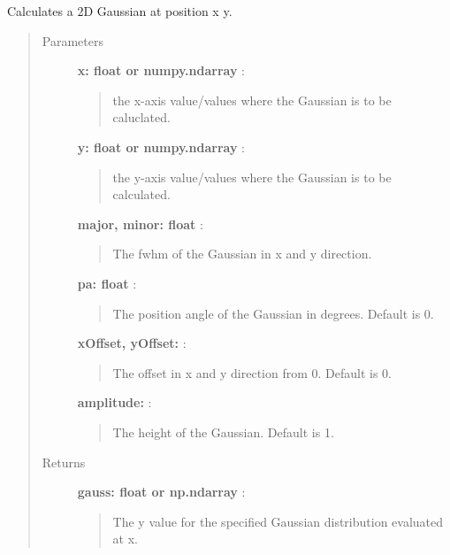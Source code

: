 \documentclass[a4paper,10pt,english]{sphinxmanual}
\begin{document}

\begin{fulllineitems}
\label{functions:astrolyze.functions.astro_functions.gauss2D}
Calculates a 2D Gaussian at position x y.
\begin{quote}\begin{description}
\item[{Parameters }] \leavevmode
\textbf{x: float or numpy.ndarray} :
\begin{quote}

the x-axis value/values where the Gaussian is to be caluclated.
\end{quote}

\textbf{y: float or numpy.ndarray} :
\begin{quote}

the y-axis value/values where the Gaussian is to be calculated.
\end{quote}

\textbf{major, minor: float} :
\begin{quote}

The fwhm of the Gaussian in x and y direction.
\end{quote}

\textbf{pa: float} :
\begin{quote}

The position angle of the Gaussian in degrees. Default is 0.
\end{quote}

\textbf{xOffset, yOffset:} :
\begin{quote}

The offset in x and y direction from 0. Default is 0.
\end{quote}

\textbf{amplitude:} :
\begin{quote}

The height of the Gaussian. Default is 1.
\end{quote}

\item[{Returns }] \leavevmode
\textbf{gauss: float or np.ndarray} :
\begin{quote}

The y value for the specified Gaussian distribution evaluated at x.
\end{quote}


\end{description}
\end{quote}
\end{fulllineitems}
\end{document}
